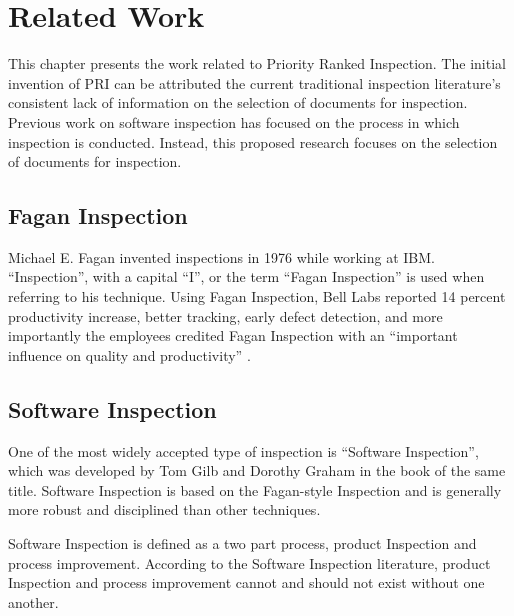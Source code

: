 
\chapter{Related Work}
\label{chapter:relatedwork}
This chapter presents the work related to Priority Ranked Inspection.  The
initial invention of PRI can be attributed the current traditional
inspection literature's consistent lack of information on the selection of
documents for inspection. Previous work on software inspection has focused
on the process in which inspection is conducted. Instead, this proposed
research focuses on the selection of documents for inspection.


\section{Fagan Inspection}
Michael E. Fagan invented inspections in 1976 while working at IBM.
``Inspection'', with a capital ``I'', or the term ``Fagan Inspection'' is
used when referring to his technique. Using Fagan Inspection, Bell Labs
reported 14 percent productivity increase, better tracking, early defect
detection, and more importantly the employees credited Fagan Inspection
with an ``important influence on quality and productivity'' \cite{Gilb93}.

\section{Software Inspection}
One of the most widely accepted type of inspection is ``Software
Inspection'', which was developed by Tom Gilb and Dorothy Graham in the
book of the same title. Software Inspection is based on the Fagan-style
Inspection and is generally more robust and disciplined than other
techniques.

Software Inspection is defined as a two part process, product Inspection
and process improvement. According to the Software Inspection literature,
product Inspection and process improvement cannot and should not exist
without one another.

